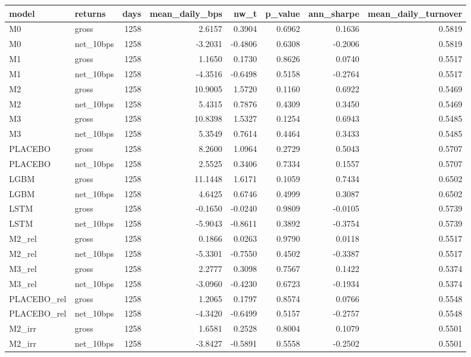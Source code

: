 \begin{tabular}{llrrrrrr}
\toprule
model & returns & days & mean\_daily\_bps & nw\_t & p\_value & ann\_sharpe & mean\_daily\_turnover \\
\midrule
M0 & gross & 1258 & 2.6157 & 0.3904 & 0.6962 & 0.1636 & 0.5819 \\
M0 & net\_10bps & 1258 & -3.2031 & -0.4806 & 0.6308 & -0.2006 & 0.5819 \\
M1 & gross & 1258 & 1.1650 & 0.1730 & 0.8626 & 0.0740 & 0.5517 \\
M1 & net\_10bps & 1258 & -4.3516 & -0.6498 & 0.5158 & -0.2764 & 0.5517 \\
M2 & gross & 1258 & 10.9005 & 1.5720 & 0.1160 & 0.6922 & 0.5469 \\
M2 & net\_10bps & 1258 & 5.4315 & 0.7876 & 0.4309 & 0.3450 & 0.5469 \\
M3 & gross & 1258 & 10.8398 & 1.5327 & 0.1254 & 0.6943 & 0.5485 \\
M3 & net\_10bps & 1258 & 5.3549 & 0.7614 & 0.4464 & 0.3433 & 0.5485 \\
PLACEBO & gross & 1258 & 8.2600 & 1.0964 & 0.2729 & 0.5043 & 0.5707 \\
PLACEBO & net\_10bps & 1258 & 2.5525 & 0.3406 & 0.7334 & 0.1557 & 0.5707 \\
LGBM & gross & 1258 & 11.1448 & 1.6171 & 0.1059 & 0.7434 & 0.6502 \\
LGBM & net\_10bps & 1258 & 4.6425 & 0.6746 & 0.4999 & 0.3087 & 0.6502 \\
LSTM & gross & 1258 & -0.1650 & -0.0240 & 0.9809 & -0.0105 & 0.5739 \\
LSTM & net\_10bps & 1258 & -5.9043 & -0.8611 & 0.3892 & -0.3754 & 0.5739 \\
M2\_rel & gross & 1258 & 0.1866 & 0.0263 & 0.9790 & 0.0118 & 0.5517 \\
M2\_rel & net\_10bps & 1258 & -5.3301 & -0.7550 & 0.4502 & -0.3387 & 0.5517 \\
M3\_rel & gross & 1258 & 2.2777 & 0.3098 & 0.7567 & 0.1422 & 0.5374 \\
M3\_rel & net\_10bps & 1258 & -3.0960 & -0.4230 & 0.6723 & -0.1934 & 0.5374 \\
PLACEBO\_rel & gross & 1258 & 1.2065 & 0.1797 & 0.8574 & 0.0766 & 0.5548 \\
PLACEBO\_rel & net\_10bps & 1258 & -4.3420 & -0.6499 & 0.5157 & -0.2757 & 0.5548 \\
M2\_irr & gross & 1258 & 1.6581 & 0.2528 & 0.8004 & 0.1079 & 0.5501 \\
M2\_irr & net\_10bps & 1258 & -3.8427 & -0.5891 & 0.5558 & -0.2502 & 0.5501 \\

\end{tabular}
